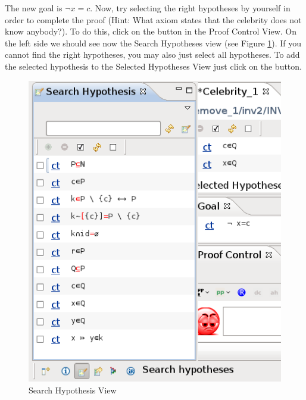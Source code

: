 The new goal is $\lnot x = c$. Now, try selecting the right hypotheses by yourself in order to complete the proof (Hint: What axiom states that the celebrity does not know anybody?). To do this, click on the  button in the \textsf{Proof Control View}. On the left side we should see now the \textsf{Search Hypotheses} view (see Figure \ref{fig_tut_08_search_hypothesis}). If you cannot find the right hypotheses, you may also just select all hypotheses. To add the selected hypothesis to the \textsf{Selected Hypotheses View} just click on the  button. 


\begin{figure}[!ht]
\begin{center}
	\includegraphics{img/tutorial/tut_08_search_hypothesis.png}
	\caption{Search Hypothesis View}
	\label{fig_tut_08_search_hypothesis}
\end{center}
\end{figure}

